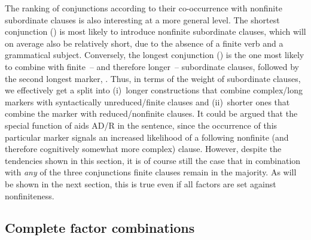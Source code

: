 The ranking of conjunctions according to their co-occurrence with nonfinite subordinate clauses is also interesting at a more general level. The shortest conjunction () is most likely to introduce nonfinite subordinate clauses, which will on average also be relatively short, due to the absence of a finite verb and a grammatical subject. Conversely, the longest conjunction () is the one most likely to combine with finite~– and therefore longer~– subordinate clauses, followed by the second longest marker, . Thus, in terms of the weight of subordinate clauses, we effectively get a split into
(i)~longer constructions that combine complex/long markers with syntactically unreduced/finite clauses and
(ii)~shorter ones that combine the marker  with reduced/nonfinite clauses. It could be argued that the special function of  aids AD/R in  the sentence, since the occurrence of this particular marker signals an increased likelihood of a following nonfinite (and therefore cognitively somewhat more complex) clause. However, despite the tendencies shown in this section, it is of course still the case that in combination with \textit{any} of the three conjunctions finite clauses remain in the majority. As will be shown in the next section, this is true even if all factors are set against nonfiniteness.

\subsection{\label{bkm:Ref75783807}Complete factor combinations}\label{sec:11.2.5}

